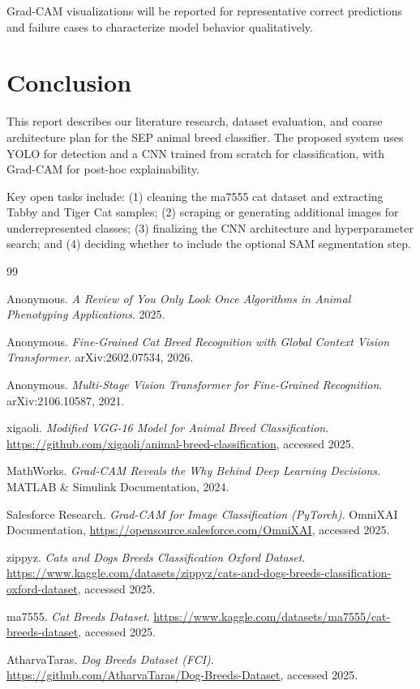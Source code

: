 \documentclass[10pt,twocolumn,letterpaper]{article}
\begin{document}
Grad-CAM visualizations will be reported for representative correct predictions and failure cases to characterize model behavior qualitatively.

\section{Conclusion}

This report describes our literature research, dataset evaluation, and coarse architecture plan for the SEP animal breed classifier. The proposed system uses YOLO for detection and a CNN trained from scratch for classification, with Grad-CAM for post-hoc explainability.

Key open tasks include: (1) cleaning the ma7555 cat dataset and extracting Tabby and Tiger Cat samples; (2) scraping or generating additional images for underrepresented classes; (3) finalizing the CNN architecture and hyperparameter search; and (4) deciding whether to include the optional SAM segmentation step.

\begin{thebibliography}{99}

Anonymous.
\textit{A Review of You Only Look Once Algorithms in Animal Phenotyping Applications}.
2025.

Anonymous.
\textit{Fine-Grained Cat Breed Recognition with Global Context Vision Transformer}.
arXiv:2602.07534, 2026.

Anonymous.
\textit{Multi-Stage Vision Transformer for Fine-Grained Recognition}.
arXiv:2106.10587, 2021.

xigaoli.
\textit{Modified VGG-16 Model for Animal Breed Classification}.
\url{https://github.com/xigaoli/animal-breed-classification}, accessed 2025.

MathWorks.
\textit{Grad-CAM Reveals the Why Behind Deep Learning Decisions}.
MATLAB \& Simulink Documentation, 2024.

Salesforce Research.
\textit{Grad-CAM for Image Classification (PyTorch)}.
OmniXAI Documentation, \url{https://opensource.salesforce.com/OmniXAI}, accessed 2025.

zippyz.
\textit{Cats and Dogs Breeds Classification Oxford Dataset}.
\url{https://www.kaggle.com/datasets/zippyz/cats-and-dogs-breeds-classification-oxford-dataset},
accessed 2025.

ma7555.
\textit{Cat Breeds Dataset}.
\url{https://www.kaggle.com/datasets/ma7555/cat-breeds-dataset},
accessed 2025.

AtharvaTaras.
\textit{Dog Breeds Dataset (FCI)}.
\url{https://github.com/AtharvaTaras/Dog-Breeds-Dataset},
accessed 2025.

\end{thebibliography}
\end{document}
